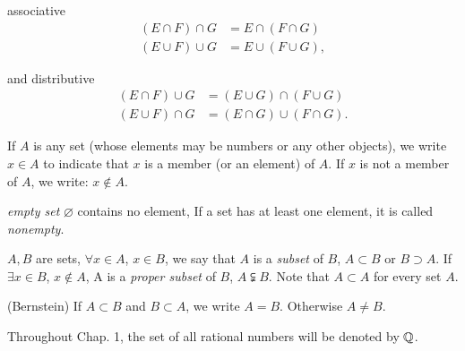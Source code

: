associative
\begin{align*}
    (E \cap F) \cap G &= E \cap (F \cap G) 	\\
    (E \cup F) \cup G &= E \cup (F \cup G), 	
\end{align*}

and distributive
\begin{align*}
    (E \cap F) \cup G &= (E \cup G) \cap (F \cup G) 	\\
    (E \cup F) \cap G &= (E \cap G) \cup (F \cap G). 	
\end{align*}


\begin{mydef}
    \label{mydef:1.3}
    If $A$ is any set (whose elements may be numbers or any other objects), 
    we write $x\in A$ to indicate that $x$ is a member (or an element) of $A$.
    If $x$ is not a member of $A$, we write: $x\notin A$.

    \emph{empty set} $\varnothing$ contains no element, If a set has at least one element, it is called \emph{nonempty}.

    $A,B$ are sets, 
    $\forall x\in A$, $x\in B$, we say that $A$ is a \emph{subset} of $B$, $A \subset B$ or $B \supset A$. 
    If $\exists x\in B$, $x\notin A$, A is a \emph{proper subset} of $B$, $A \subsetneqq B$.
    Note that $A\subset A$ for every set $A$.

    (Bernstein) If $A\subset B$ and $B\subset A$, we write $A = B$. Otherwise $A \neq B$.
\end{mydef}

\begin{mydef}
    \label{mydef:1.4}
    Throughout Chap. 1, the set of all rational numbers will be denoted by ${\protect\mathbb Q} $.
\end{mydef}